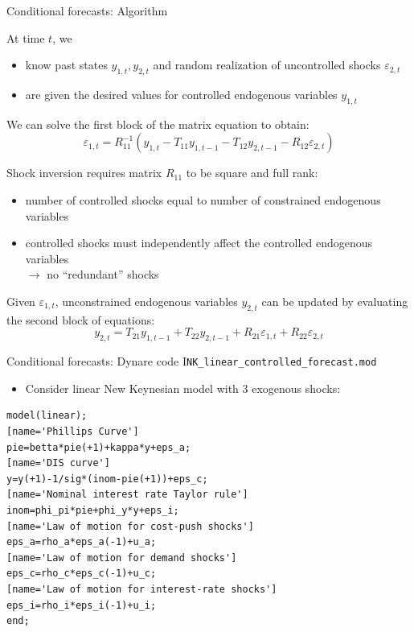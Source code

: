 \documentclass[handout,usepdftitle=false,xcolor=dvipsnames,aspectratio=169]{beamer}
\begin{document}
\begin{frame}{Conditional forecasts: Algorithm}
  \begin{witemize}
    \item At time $t$, we
    \begin{itemize}
      \item  know past states $y_{1,t}, y_{2,t}$ and random realization of uncontrolled shocks $\varepsilon_{2,t}$
      \item are given the desired values for controlled endogenous variables $y_{1,t}$
    \end{itemize}
    \item We can solve the first block of the matrix equation to obtain:
    \begin{equation}
      \varepsilon_{1,t} = R_{11}^{-1} \left( y_{1,t} - T_{11}y_{1,t-1} - T_{12}y_{2,t-1} - R_{12}\varepsilon_{2,t} \right)
    \end{equation}
    \item Shock inversion requires matrix $R_{11}$ to be square and full rank:
    \begin{itemize}
      \item number of controlled shocks equal to number of constrained endogenous variables
      \item controlled shocks must independently affect the controlled endogenous variables\\
            $\rightarrow$ no ``redundant'' shocks
    \end{itemize}
    \item Given $\varepsilon_{1,t}$, unconstrained endogenous variables $y_{2,t}$ can be updated by evaluating the second block of equations:
    \begin{equation}
      y_{2,t} = T_{21}y_{1,t-1} + T_{22}y_{2,t-1} + R_{21}\varepsilon_{1,t} + R_{22}\varepsilon_{2,t}
    \end{equation}
  \end{witemize}
\end{frame}

\begin{frame}[fragile]{Conditional forecasts: Dynare code I}{\texttt{NK\_linear\_controlled\_forecast.mod}}
  \begin{itemize}
    \item Consider linear New Keynesian model with 3 exogenous shocks:
  \end{itemize}
  \small
  \begin{verbatim}
model(linear);
[name='Phillips Curve']   
pie=betta*pie(+1)+kappa*y+eps_a;
[name='DIS curve']
y=y(+1)-1/sig*(inom-pie(+1))+eps_c;
[name='Nominal interest rate Taylor rule']
inom=phi_pi*pie+phi_y*y+eps_i;   
[name='Law of motion for cost-push shocks']
eps_a=rho_a*eps_a(-1)+u_a;
[name='Law of motion for demand shocks']
eps_c=rho_c*eps_c(-1)+u_c;
[name='Law of motion for interest-rate shocks']
eps_i=rho_i*eps_i(-1)+u_i;
end;
\end{verbatim}
\end{frame}
\end{document}

